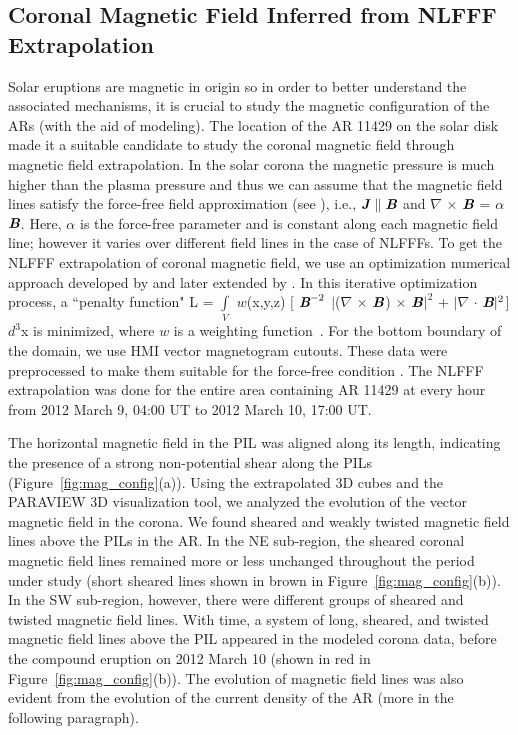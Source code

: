 \documentclass{aastex62}
\begin{document}
\subsection{\textbf{Coronal Magnetic Field Inferred from NLFFF Extrapolation}}
Solar eruptions are magnetic in origin so in order to better understand the associated mechanisms, it is crucial to study the magnetic configuration of the ARs (with the aid of modeling). The location of the AR 11429 on the solar disk made it a suitable candidate to study the coronal magnetic field through magnetic field extrapolation. In the solar corona the magnetic pressure is much higher than the plasma pressure and thus we can assume that the magnetic field lines satisfy the force-free field approximation (see \citealt{Wiegelmann_and_Sakurai_2012}), i.e., $\textit{\textbf{J}}$$\parallel$$\textit{\textbf{B}}$ and $\nabla$ $\times$ $\textit{\textbf{B}}$ = $\alpha$$\textit{\textbf{B}}$. Here, $\alpha$ is the force-free parameter and is constant along each magnetic field line; however it varies over different field lines in the case of NLFFFs. To get the NLFFF extrapolation of coronal magnetic field, we use an optimization numerical approach developed by \citet{Wheatland_etal_2000} and later extended by \citet{Wiegelmann_2004}. In this iterative optimization process, a ``penalty function" L = $\int\limits_{V}$ $w$(x,y,z) $\Big[$ $\textit{\textbf{B}}^{-2}$ $|$($\nabla$ $\times$ $\textit{\textbf{B}}$) $\times$ $\textit{\textbf{B}}$$|^{2}$ + $|$$\nabla$ $\cdot$ $\textit{\textbf{B}}|^{2}$$\Big]$$d^{3}$x is minimized, where $w$ is a weighting function~\citep{Wiegelmann_2004}. For the bottom boundary of the domain, we use HMI vector magnetogram cutouts. These data were preprocessed to make them suitable for the force-free condition \citep{Wiegelmann_etal_2006}. The NLFFF extrapolation was done for the entire area containing AR 11429 at every hour from 2012 March 9, 04:00 UT to 2012 March 10, 17:00 UT.




The horizontal magnetic field in the PIL was aligned along its length, indicating the presence of a strong non-potential shear along the PILs (Figure~\ref{fig:mag_config}(a)). Using the extrapolated 3D cubes and the PARAVIEW 3D visualization tool, we analyzed the evolution of the vector magnetic field in the corona. We found sheared and weakly twisted magnetic field lines above the PILs in the AR. In the NE sub-region, the sheared coronal magnetic field lines remained more or less unchanged throughout the period under study (short sheared lines shown in brown in Figure~\ref{fig:mag_config}(b)). In the SW sub-region, however, there were different groups of sheared and twisted magnetic field lines. With time, a system of long, sheared, and twisted magnetic field lines above the PIL appeared in the modeled corona data, before the compound eruption on 2012 March 10 (shown in red in Figure~\ref{fig:mag_config}(b)). The evolution of magnetic field lines was also evident from the evolution of the current density of the AR (more in the following paragraph).
\end{document}
